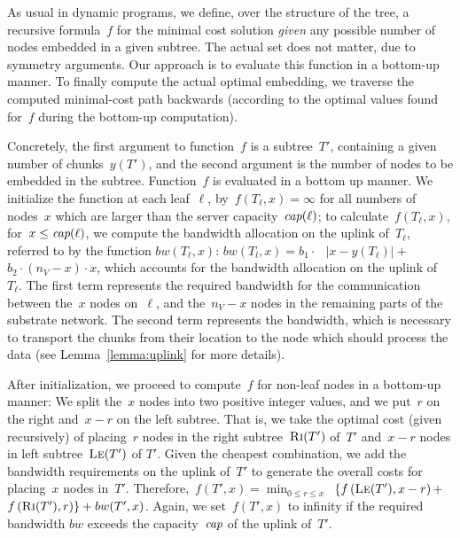 \documentclass[preprint,12pt]{elsarticle}
\newcommand{\ChunkCount}{\ensuremath{y}}
\newcommand{\capacity}{\emph{cap}}
\newcommand{\Tree}{\ensuremath{T}}
\newcommand{\CostTrans}{\ensuremath{b_1}}
\newcommand{\CostCom}{\ensuremath{b_2}}
\newcommand{\Vms}{\ensuremath{n_V}}
\begin{document}
As usual in dynamic programs, we define, over the structure of the tree, a
recursive formula~$f$ for
the minimal cost solution \emph{given} any possible number of nodes
embedded in a given subtree. The actual set does not matter,
due to symmetry arguments.
Our approach is to evaluate this function in a bottom-up
manner.
To finally compute the actual optimal embedding,
we traverse the computed minimal-cost path backwards
(according to
the optimal values found for~$f$ during the bottom-up computation).

Concretely, the first argument to function~$f$
is a subtree~$\Tree'$, containing a given number of
chunks~$\ChunkCount(\Tree')$,
and the
second argument is the number of nodes to be embedded in the subtree.
Function~$f$ is evaluated in a bottom up manner. We initialize the
function at each leaf~$\ell$, by~$f(T_{\ell},x) =
\infty$ for all numbers of nodes~$x$ which are larger than
the server capacity~$\capacity(\ell)$;
to calculate~$f(T_{\ell}, x)$, for~$x \leq \capacity(\ell)$, we compute the
bandwidth allocation on the uplink of~$T_{\ell}$, referred to by the function
$bw(T_{\ell},x)$:
$bw(T_l,x)=  \CostTrans \cdot~$~$|x - \ChunkCount(T_{\ell})| +$~$ \CostCom \cdot
(\Vms - x) \cdot x$,
which accounts for the bandwidth allocation on the uplink of~$T_{\ell}$. The
first
term represents the required bandwidth for the communication between the~$x$
nodes on~$\ell$, and the~$\Vms - x$ nodes in the remaining parts of the substrate
network.
The second term represents
the bandwidth, which is necessary to transport the chunks from their location to
the node which should process the data (see Lemma~\ref{lemma:uplink} for more
details).

After initialization, we proceed to compute~$f$ for non-leaf
nodes in a bottom-up manner: We split the~$x$ nodes
into two positive integer
values, and we put~$r$ on the right and~$x - r$ on the left subtree.
That is, we take the optimal cost
(given recursively) of placing~$r$ nodes in
the right subtree~$\textsc{Ri}(T')$ of~$T'$ and~$x-r$ nodes in left subtree~$\textsc{Le}(T')$ of
$T'$. Given the cheapest combination, we add the bandwidth requirements
on the uplink of~$T'$ to generate the overall costs for placing~$x$ nodes in~$T'$.
Therefore,~$f(T',x) =   \min_{0\leq r \leq x}$~$ \{  f\left(\textsc{Le}(T'),
x-r\right) +$~$
f\left(\textsc{Ri}(T'), r\right) \} + bw(T',x)$.
Again, we set~$f(T',x)$ to infinity if the required bandwidth
$bw$ exceeds the capacity~$\capacity$ of the uplink of~$T'$.
\end{document}
